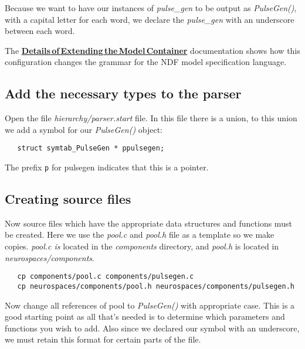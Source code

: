 \documentclass[12pt]{article}
\begin{document}
Because we want to have our instances of {\it pulse\_gen} to be output as {\it PulseGen()}, with a capital letter for each word, we declare the  {\it pulse\_gen} with an underscore between each word.

The \href{../genesis-extend-model-container-detail/genesis-extend-model-container-detail.tex}{\bf Details\,of\,Extending\,the\,Model\,Container} documentation shows how this configuration changes the grammar for the NDF model specification language.

\subsection*{Add the necessary types to the parser}

Open the file {\it hierarchy/parser.start} file. In this file there is a union, to this union we add a symbol for our {\it PulseGen()} object:
\begin{verbatim}
   struct symtab_PulseGen * ppulsegen;
\end{verbatim}
The prefix {\tt p} for pulsegen indicates that this is a pointer.

\subsection*{Creating source files}

Now source files which have the appropriate data structures and functions must be created. Here we use the {\it pool.c} and {\it pool.h} file as a template so we make copies. {\it pool.c is} located in the {\it components} directory, and {\it pool.h} is located in {\it neurospaces/components}.
\begin{verbatim}
   cp components/pool.c components/pulsegen.c
   cp neurospaces/components/pool.h neurospaces/components/pulsegen.h
\end{verbatim}
Now change all references of pool to {\it PulseGen()} with appropriate case. This is a good starting point as all that's needed is to determine which parameters and functions you wish to add. Also since we declared our symbol with an underscore, we must retain this format for certain parts of the file.
\end{document}

